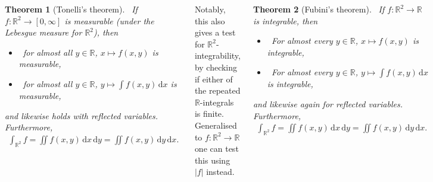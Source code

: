 \documentclass{tikzposter} %
\newtheorem{theorem}{Theorem}
\begin{document}
\begin{columns}
{      \begin{theorem}[Tonelli's theorem]
        \ If $f : \mathbb{R}^{2} \to [0,\infty]$ is measurable (under the Lebesgue measure for $\mathbb{R}^{2}$), then
        \begin{itemize}
          \item \ for almost all $y \in \mathbb{R}$, $x \mapsto f(x,y)$ is measurable,
          \item \ for almost all $y \in \mathbb{R}$, $y \mapsto \int f(x,y) \, \mathrm{d}x$ is measurable,
        \end{itemize}
        and likewise holds with reflected variables. Furthermore,
        \begin{align*}
          \int_{\mathbb{R}^{2}} f = \iint f(x,y) \, \mathrm{d}x \, \mathrm{d}y = \iint f(x,y) \, \mathrm{d}y \, \mathrm{d}x.
        \end{align*}
      \end{theorem}
      \hphantom{}

      Notably, this also gives a test for $\mathbb{R}^{2}$-integrability, by checking if either of the repeated $\mathbb{R}$-integrals is finite. Generalised to $f : \mathbb{R}^{2} \to \mathbb{R}$ one can test this using $|f|$ instead. \\

      \begin{theorem}[Fubini's theorem]
        \ If $f : \mathbb{R}^{2} \to \mathbb{R}$ is integrable, then
        \begin{itemize}
                \item \ For almost every $y \in \mathbb{R}$, $x \mapsto f(x,y)$ is integrable,
                \item \ For almost every $y \in \mathbb{R}$, $y \mapsto \int f(x,y) \, \mathrm{d}x$ is integrable,
        \end{itemize}
        and likewise again for reflected variables. Furthermore,
        \begin{align*}
          \int_{\mathbb{R}^{2}} f = \iint f(x,y) \, \mathrm{d}x \, \mathrm{d}y = \iint f(x,y) \, \mathrm{d}y \, \mathrm{d}x.
        \end{align*}
      \end{theorem}
      \hphantom{}

      While Tonelli's theorem is taken as given in this course, Fubini's theorem follows from applying Tonelli's theorem to $f^{+}$ and $f^{-}$, giving $\int_{\mathbb{R}^{2}} f^{\pm} = \iint f^{\pm}(x,y) \, \mathrm{d}x \, \mathrm{d}y < \infty$ by integrability, so $\int f^{\pm}(x,y) \, \mathrm{d}x < \infty$ for almost all $y$. \\

}
\end{columns}
\end{document}
